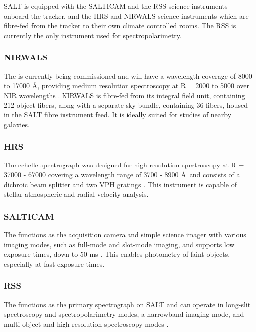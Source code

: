 SALT is equipped with the \gls{SALTICAM} and the \gls{RSS} science instruments onboard the tracker, and the \gls{HRS} and \gls{NIRWALS} science instruments which are fibre-fed from the tracker to their own climate controlled rooms. The \gls{RSS} is currently the only instrument used for spectropolarimetry.

\subsubsection{\gls{NIRWALS}}

The  is currently being commissioned and will have a wavelength coverage of 8000 to 17000 \AA, providing medium resolution spectroscopy at R = 2000 to 5000 over \gls{NIR} wavelengths \citep{NIRWALS, SALT_NIRWALS}. \gls{NIRWALS} is fibre-fed from its integral field unit, containing 212 object fibers, along with a separate sky bundle, containing 36 fibers, housed in the \gls{SALT} fibre instrument feed. It is ideally suited for studies of nearby galaxies.

\subsubsection{\gls{HRS}}

The  echelle spectrograph was designed for high resolution spectroscopy at R = 37000 - 67000 covering a wavelength range of 3700 - 8900 \AA\ and consists of a dichroic beam splitter and two \gls{VPH} gratings \citep{SALT_hires}. This instrument is capable of stellar atmospheric and radial velocity analysis.

\subsubsection{\gls{SALTICAM}}

The  functions as the acquisition camera and simple science imager with various imaging modes, such as full-mode and slot-mode imaging, and supports low exposure times, down to 50 ms \citep{SALTICAM}. This enables photometry of faint objects, especially at fast exposure times.

\subsubsection{\gls{RSS}} \label{subsubsec:RSS}

The  functions as the primary spectrograph on \gls{SALT} and can operate in long-slit spectroscopy and spectropolarimetry modes, a narrowband imaging mode, and multi-object and high resolution spectroscopy modes \citep[for an in-depth discussion on operational modes see][or the \href{https://pysalt.salt.ac.za/proposal_calls/current/ProposalCall.html}{latest call for proposals}]{SALT_operational_modes}.

